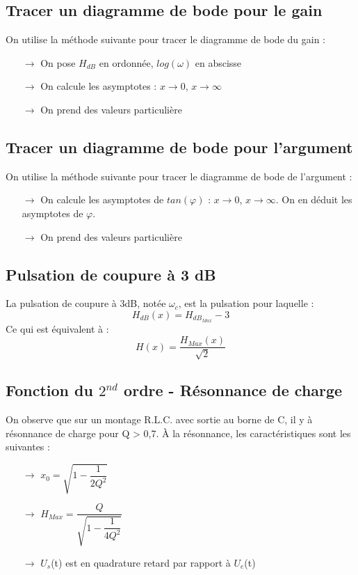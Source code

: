 \subsection{Tracer un diagramme de bode pour le gain}
On utilise la méthode suivante pour tracer le diagramme de bode du gain : 
\begin{itemize}
 \item[$\rightarrow$] On pose $H_{dB}$ en ordonnée, $log(\omega)$ en abscisse
 \item[$\rightarrow$] On calcule les asymptotes : $x \rightarrow 0$, $x \rightarrow \infty$
\item[$\rightarrow$] On prend des valeurs particulière
\end{itemize}
\subsection{Tracer un diagramme de bode pour l'argument}
On utilise la méthode suivante pour tracer le diagramme de bode de l'argument : 
\begin{itemize}
 \item[$\rightarrow$] On calcule les asymptotes de $tan(\varphi)$ : $x \rightarrow 0$, $x \rightarrow \infty$. On en déduit les asymptotes de $\varphi$.
\item[$\rightarrow$] On prend des valeurs particulière
\end{itemize}
\subsection{Pulsation de coupure à 3 dB}
\begin{de}
La pulsation de coupure à 3dB, notée $\omega_c$, est la pulsation pour laquelle :
$$H_{dB}(x) = H_{dB_{Max}} - 3$$
Ce qui est équivalent à :
$$H(x) = \dfrac{H_{Max}(x)}{\sqrt{2}}$$
\end{de}
\subsection{Fonction du $2^{nd}$ ordre - Résonnance de charge}
On observe que sur un montage R.L.C. avec sortie au borne de C, il y à résonnance de charge pour Q > 0,7.
À la résonnance, les caractéristiques sont les suivantes :\\
\begin{itemize}
 \item[$\rightarrow$]$x_0 = \sqrt{1-\dfrac{1}{2Q^2}}$\\
 \item[$\rightarrow$]$H_{Max} = \dfrac{Q}{\sqrt{1 - \dfrac{1}{4Q^2}}}$\\
 \item[$\rightarrow$]$U_s$(t) est en quadrature retard par rapport à $U_e$(t)\\
\end{itemize}
